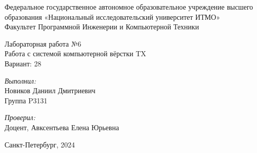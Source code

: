 \begin{center}
\large Федеральное государственное автономное образовательное учреждение высшего образования «Национальный исследовательский университет ИТМО»\\
Факультет Программной Инженерии и Компьютерной Техники\\
\hfill 


\vspace{7cm}
\Large Лабораторная работа №6 \\
Работа с системой компьютерной вёрстки T\raisebox{-0.3em}{E}X\\
Вариант: 28\\
\end{center}

\vspace{7.5cm}
 
\begin{flushright}
\textit{Выполнил:}\\
Новиков Даниил Дмитриевич\\
Группа P3131\

\textit{Проверил:}\\
Доцент, Авксентьева Елена Юрьевна\\
\end{flushright}
 
\vfill

\begin{center} Санкт-Петербург, 2024 \end{center}

\thispagestyle{empty}